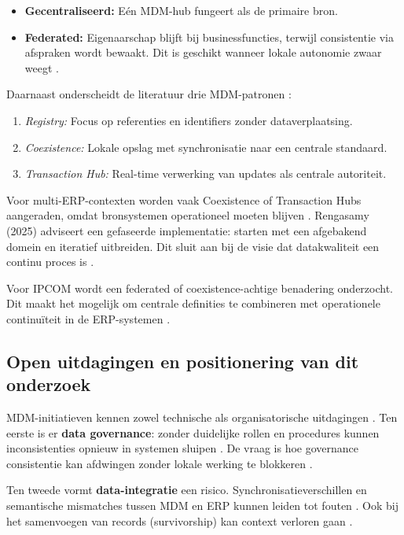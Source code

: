\begin{itemize}
    \item \textbf{Gecentraliseerd:} Eén MDM-hub fungeert als de primaire bron.
    \item \textbf{Federated:} Eigenaarschap blijft bij businessfuncties, terwijl consistentie via afspraken wordt bewaakt. Dit is geschikt wanneer lokale autonomie zwaar weegt \autocite{Rengasamy2025}.
\end{itemize}

Daarnaast onderscheidt de literatuur drie MDM-patronen \autocite{Rengasamy2025}:
\begin{enumerate}
    \item \emph{Registry:} Focus op referenties en identifiers zonder dataverplaatsing.
    \item \emph{Coexistence:} Lokale opslag met synchronisatie naar een centrale standaard.
    \item \emph{Transaction Hub:} Real-time verwerking van updates als centrale autoriteit.
\end{enumerate}

Voor multi-ERP-contexten worden vaak Coexistence of Transaction Hubs aangeraden, omdat bronsystemen operationeel moeten blijven \autocite{Maedche2010}. Rengasamy (2025) adviseert een gefaseerde implementatie: starten met een afgebakend domein en iteratief uitbreiden. Dit sluit aan bij de visie dat datakwaliteit een continu proces is \autocite{Hikmawati}.

Voor IPCOM wordt een federated of coexistence-achtige benadering onderzocht. Dit maakt het mogelijk om centrale definities te combineren met operationele continuïteit in de ERP-systemen \autocite{Rengasamy2025}.

\subsection{Open uitdagingen en positionering van dit onderzoek}
MDM-initiatieven kennen zowel technische als organisatorische uitdagingen \autocite{Pansara2021}.
Ten eerste is er \textbf{data governance}: zonder duidelijke rollen en procedures kunnen inconsistenties opnieuw in systemen sluipen \autocite{Pansara2021}. De vraag is hoe governance consistentie kan afdwingen zonder lokale werking te blokkeren \autocite{VilminkoHeikkinenPekkola2019}.

Ten tweede vormt \textbf{data-integratie} een risico. Synchronisatieverschillen en semantische mismatches tussen MDM en ERP kunnen leiden tot fouten \autocite{Maedche2010}. Ook bij het samenvoegen van records (survivorship) kan context verloren gaan \autocite{Pansara2021}.

